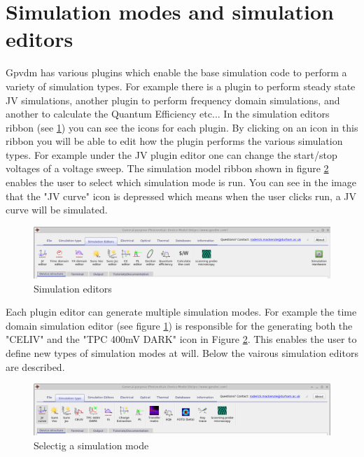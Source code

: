 \newpage
\section{Simulation modes and simulation editors}
\label{sec:simmodes}

Gpvdm has various plugins which enable the base simulation code to perform a variety of simulation types. For example there is a plugin to perform steady state JV simulations, another plugin to perform frequency domain simulations, and another to calculate the Quantum Efficiency etc... In the simulation editors ribbon (see \ref{fig:simeditors}) you can see the icons for each plugin. By clicking on an icon in this ribbon you will be able to edit how the plugin performs the various simulation types.  For example under the JV plugin editor one can change the start/stop voltages of a voltage sweep.  The simulation model ribbon shown in figure \ref{fig:simmodes} enables the user to select which simulation mode is run.  You can see in the image that the "JV curve" icon is depressed which means when the user clicks run, a JV curve will be simulated. 
\begin{figure}[H]
\centering
\includegraphics[width=1.0\textwidth]{./images/ribbon_sim_editors.png}
\caption{Simulation editors}
\label{fig:simeditors}
\end{figure}

Each plugin editor can generate multiple simulation modes.  For example the time domain simulation editor (see figure \ref{fig:simeditors}) is responsible for the generating both the "CELIV" and the "TPC 400mV DARK" icon in Figure \ref{fig:simmodes}. This enables the user to define new types of simulation modes at will. Below the vairous simulation editors are described.

\begin{figure}[H]
\centering
\includegraphics[width=1.0\textwidth]{./images/ribbon_sim_modes.png}
\caption{Selectig a simulation mode}
\label{fig:simmodes}
\end{figure}

